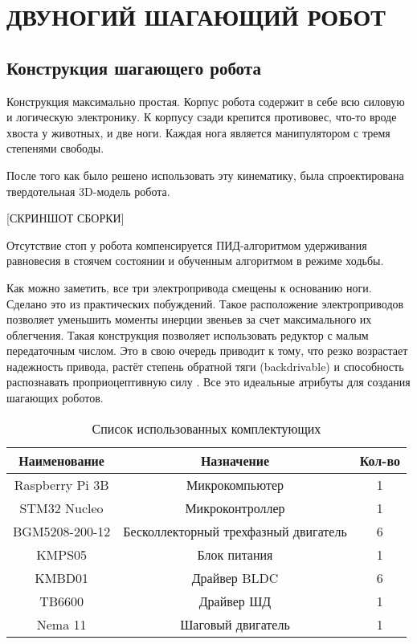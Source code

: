\chapter{\MakeUppercase{Двуногий шагающий робот}}
\section{Конструкция шагающего робота}
Конструкция максимально простая. Корпус робота содержит в себе всю силовую и логическую электронику. К корпусу сзади крепится противовес, что-то вроде хвоста у животных, и две ноги. Каждая нога является манипулятором с тремя степенями свободы. 

После того как было решено использовать эту кинематику, была спроектирована твердотельная 3D-модель робота.

\begin{center}
    [СКРИНШОТ СБОРКИ]
\end{center}

Отсутствие стоп у робота компенсируется ПИД-алгоритмом удерживания равновесия в стоячем состоянии и обученным алгоритмом в режиме ходьбы.

Как можно заметить, все три электропривода смещены к основанию ноги. Сделано это из практических побуждений. Такое расположение электроприводов позволяет уменьшить моменты инерции звеньев за счет максимального их облегчения. Такая конструкция позволяет использовать редуктор с малым передаточным числом. Это в свою очередь приводит к тому, что резко возрастает надежность привода, растёт степень обратной тяги (backdrivable) и способность распознавать проприоцептивную силу \cite{Seok2012}. Все это идеальные атрибуты для создания шагающих роботов.

\begin{table}[ht]
    \caption{Список использованных комплектующих}
    \label{tab_stuff}
    \centering
    \begin{tabular}{|c|c|c|}
        \hline Наименование     & Назначение        & Кол-во \\
        \hline Raspberry Pi 3B  & Микрокомпьютер    & 1 \\
        \hline STM32 Nucleo     & Микроконтроллер   & 1 \\
        \hline BGM5208-200-12   & Бесколлекторный трехфазный двигатель & 6 \\
        \hline KMPS05           & Блок питания      & 1 \\
        \hline KMBD01           & Драйвер BLDC      & 6 \\
        \hline TB6600           & Драйвер ШД        & 1 \\
        \hline Nema 11          & Шаговый двигатель & 1 \\
        \hline
    \end{tabular}
\end{table}

